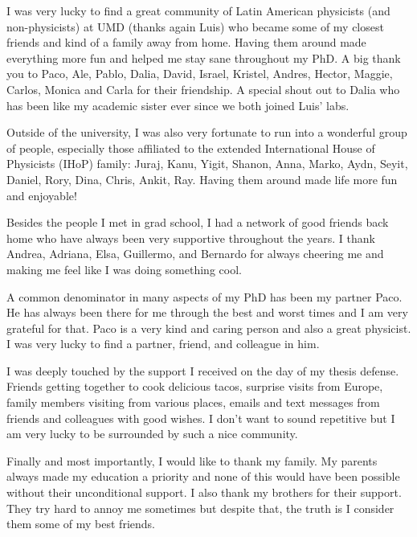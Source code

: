 I was very lucky to find a great community of Latin American physicists (and non-physicists) at UMD (thanks again Luis) who became some of my closest friends and kind of a family away from home. Having them around made everything more fun and helped me stay sane throughout my PhD. A big thank you to Paco, Ale, Pablo, Dalia, David, Israel, Kristel, Andres, Hector, Maggie, Carlos, Monica and Carla for their friendship. A special shout out to Dalia who has been like my academic sister ever since we both joined Luis' labs. 

Outside of the university, I was also very fortunate to run into a wonderful group of people, especially those affiliated to the extended International House of Physicists (IHoP) family: Juraj, Kanu, Yigit, Shanon, Anna, Marko, Aydn, Seyit, Daniel, Rory, Dina, Chris, Ankit, Ray. Having them around made life more fun and enjoyable!

Besides the people I met in grad school, I had a network of good friends back home who have always been very supportive throughout the years. I thank Andrea, Adriana, Elsa, Guillermo, and Bernardo for always cheering me and making me feel like I was doing something cool. 

A common denominator in many aspects of my PhD has been my partner Paco. He has always been there for me through the best and worst times and I am very grateful for that. Paco is a very kind and caring person and also a great physicist. I was very lucky to find a partner, friend, and colleague in him. 

I was deeply touched by the support I received on the day of my thesis defense. Friends getting together to cook delicious tacos, surprise visits from Europe, family members visiting from various places, emails and text messages from friends and colleagues with good wishes. I don't want to sound repetitive but I am very lucky to be surrounded by such a nice community. 

Finally and most importantly, I would like to thank my family. My parents always made my education a priority and none of this would have been possible without their unconditional support. I also thank my brothers for their support. They try hard to annoy me sometimes but despite that, the truth is I consider them some of my best friends.

